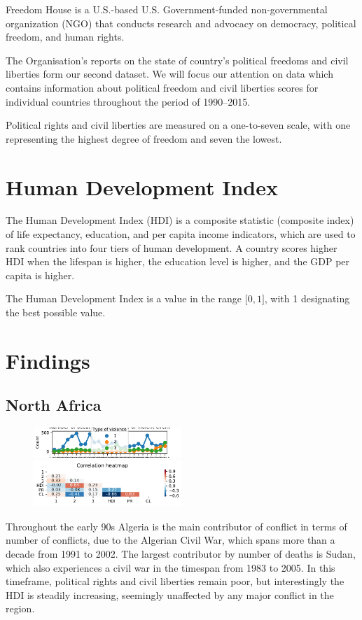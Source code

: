 \documentclass[a4paper,11pt]{article}
\begin{document}
Freedom House is a U.S.-based U.S. Government-funded non-governmental
organization (NGO) that conducts research and advocacy on democracy,
political freedom, and human rights.

The Organisation's reports on the state of country's political freedoms and
civil liberties form our second dataset.
We will focus our attention on data
which contains information about political freedom and civil liberties
scores for individual countries throughout the period of 1990--2015.

Political rights and civil liberties are measured on a one-to-seven
scale, with one representing the highest degree of freedom and seven the
lowest.

\section{Human Development Index}

The Human Development Index (HDI) is a composite statistic (composite
index) of life expectancy, education, and per capita income indicators,
which are used to rank countries into four tiers of human development. A
country scores higher HDI when the lifespan is higher, the education
level is higher, and the GDP per capita is higher.

The Human Development Index is a value in the range ${[}0,1{]}$, with 1 designating
the best possible value.

\section{Findings}

\subsection{North Africa}
\begin{figure}[ht!]
    \includegraphics[width=0.50\textwidth]{images/na.pdf}
    \includegraphics[width=0.50\textwidth]{images/na_corr.pdf}
\end{figure}
Throughout the early 90s Algeria is the main contributor of conflict in terms of number of conflicts, due to the Algerian Civil War, which spans more than a decade from 1991 to 2002. The largest contributor by number of deaths is Sudan, which also experiences a civil war in the timespan from 1983 to 2005. In this timeframe, political rights and civil liberties remain poor, but interestingly the HDI is steadily increasing, seemingly unaffected by any major conflict in the region.
\end{document}
